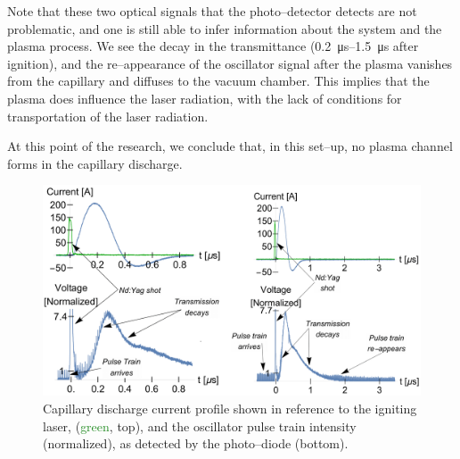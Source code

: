 \documentclass[../main.tex]{subfiles}
\begin{document}
Note that these two optical signals that the photo--detector detects are not problematic, and one is still able to infer information about the system and the plasma process. We see the decay in the transmittance (\SIrange{0.2}{1.5}{\us} after ignition), and the re--appearance of the oscillator signal after the plasma vanishes from the capillary and diffuses to the vacuum chamber. This implies that the plasma does influence the laser radiation, with the lack of conditions for transportation of the laser radiation.

At this point of the research, we conclude that, in this set--up, no plasma channel forms in the capillary discharge.

\begin{figure}
    \centering
    \includegraphics[width=\textwidth]{figures/Curved capillaries/curved-pulsetrain-merged.png}
    \caption{Capillary discharge current profile shown in reference to the igniting laser, (\textcolor{ForestGreen}{green}, top), and the oscillator pulse train intensity (normalized), as detected by the photo--diode (bottom).}
    \label{fig:oscillator-bump}
\end{figure}
\end{document}
